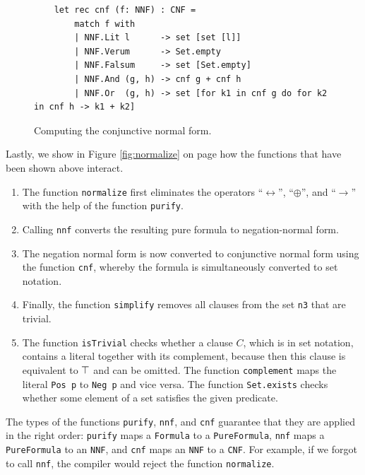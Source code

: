 \begin{figure}[!ht]
  \centering
\begin{verbatim}
    let rec cnf (f: NNF) : CNF =
        match f with
        | NNF.Lit l      -> set [set [l]]
        | NNF.Verum      -> Set.empty
        | NNF.Falsum     -> set [Set.empty]
        | NNF.And (g, h) -> cnf g + cnf h
        | NNF.Or  (g, h) -> set [for k1 in cnf g do for k2 in cnf h -> k1 + k2]
\end{verbatim}
\vspace*{-0.3cm}
  \caption{Computing the conjunctive normal form. }
  \label{fig:cnf}
\end{figure}
Lastly, we show in Figure \ref{fig:normalize} on page \pageref{fig:normalize}
how the functions that have been shown above interact.
\begin{enumerate}
\item The function \texttt{normalize} first eliminates the operators ``$\leftrightarrow$'', ``$\oplus$'',
      and ``$\rightarrow$'' with the help of the function \texttt{purify}.
\item Calling \texttt{nnf} converts the resulting pure formula to negation-normal form.
\item The negation normal form is now converted to conjunctive normal form using the function \texttt{cnf},
      whereby the formula is simultaneously converted to set notation.
\item Finally, the function \texttt{simplify} removes all clauses from the set \texttt{n3} that are trivial.
\item The function \texttt{isTrivial} checks whether a clause $C$, which is in set notation,
      contains a literal together with its complement, because then this
      clause is equivalent to $\top$ and can be omitted.  The function \texttt{complement} maps the literal
      \texttt{Pos p} to \texttt{Neg p} and vice versa.  The function \texttt{Set.exists} checks whether some
      element of a set satisfies the given predicate.
\end{enumerate}
The types of the functions \texttt{purify}, \texttt{nnf}, and \texttt{cnf} guarantee that they are applied in
the right order: \texttt{purify} maps a \texttt{Formula} to a \texttt{PureFormula}, \texttt{nnf} maps a
\texttt{PureFormula} to an \texttt{NNF}, and \texttt{cnf} maps an \texttt{NNF} to a \texttt{CNF}.  For example,
if we forgot to call \texttt{nnf}, the \Fsharp{} compiler would reject the function \texttt{normalize}.

